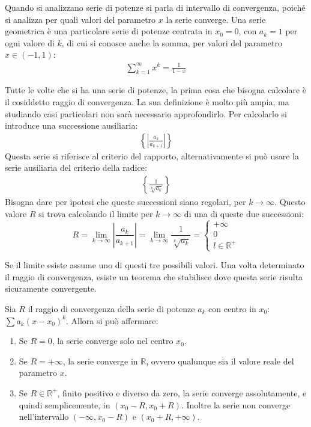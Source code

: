 \documentclass{article}
\numberwithin{equation}{subsection}
\begin{document}
Quando si analizzano serie di potenze si parla di intervallo di convergenza, poiché si analizza per quali valori del parametro $x$ la serie converge. Una serie geometrica è una particolare serie di potenze centrata in $x_0=0$, con $a_k=1$ per ogni valore di $k$, di cui si conosce anche la somma, per valori del parametro $x\in(-1,1)$:
\begin{gather*}
    \displaystyle\sum_{k=1}^\infty x^k=\frac{1}{1-x}
\end{gather*}

Tutte le volte che si ha una serie di potenze, la prima cosa che bisogna calcolare è il cosiddetto raggio di convergenza. La sua definizione è molto più ampia, ma studiando casi particolari non sarà necessario approfondirlo. Per calcolarlo si introduce una successione ausiliaria:
\begin{gather*}
    \left\{\displaystyle\left|\frac{a_k}{a_{k+1}}\right|\right\}
\end{gather*}
Questa serie si riferisce al criterio del rapporto, alternativamente si può usare la serie ausiliaria del criterio della radice:
\begin{gather*}
    \left\{\displaystyle\frac{1}{\sqrt[k]{a_k}}\right\}
\end{gather*}
Bisogna dare per ipotesi che queste successioni siano regolari, per $k\to\infty$. Questo valore $R$ si trova calcolando il limite per $k\to\infty$ di una di queste due successioni:
\begin{equation}
    R=\lim_{k\to\infty}\displaystyle\left|\frac{a_k}{a_{k+1}}\right|=\lim_{k\to\infty}\frac{1}{\sqrt[k]{a_k}}=\begin{cases}
        +\infty\\
        0\\
        l\in\mathbb{R}^+
    \end{cases}
\end{equation}

Se il limite esiste assume uno di questi tre possibili valori. Una volta determinato il raggio di convergenza, esiste un teorema che stabilisce dove questa serie risulta sicuramente convergente. 

Sia $R$ il raggio di convergenza della serie di potenze $a_k$ con centro in $x_0$: $\sum a_k(x-x_0)^k$. Allora si può affermare:
\begin{enumerate}
    \item Se $R=0$, la serie converge solo nel centro $x_0$. 
    \item Se $R=+\infty$, la serie converge in $\mathbb{R}$, ovvero qualunque sia il valore reale del parametro $x$. 
    \item Se $R\in\mathbb{R}^+$, finito positivo e diverso da zero, la serie converge assolutamente, e quindi semplicemente, in $(x_0-R, x_0+R)$. Inoltre la serie non converge nell'intervallo $(-\infty,x_0-R)$ e $(x_0+R, +\infty)$. 
\end{enumerate}
\end{document}
